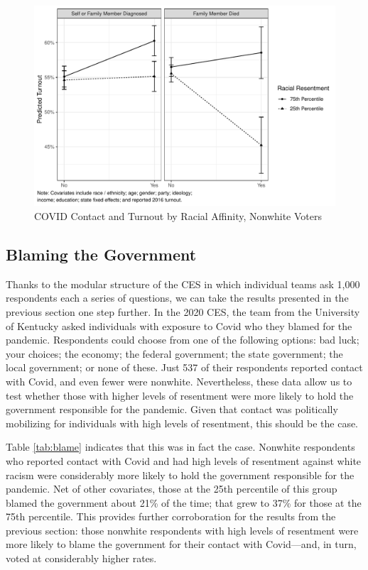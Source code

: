 \documentclass[
  12pt,
]{article}
\begin{document}
\begin{figure}[H]

{\centering \includegraphics{wa_covid_files/figure-latex/mef2-1} 

}

\caption{\label{fig:mef-ces-2}COVID Contact and Turnout by Racial Affinity, Nonwhite Voters}\label{fig:mef2}
\end{figure}

\hypertarget{blaming-the-government}{%
\subsection*{Blaming the Government}\label{blaming-the-government}}

Thanks to the modular structure of the CES in which individual teams ask 1,000 respondents each a series of questions, we can take the results presented in the previous section one step further. In the 2020 CES, the team from the University of Kentucky asked individuals with exposure to Covid who they blamed for the pandemic. Respondents could choose from one of the following options: bad luck; your choices; the economy; the federal government; the state government; the local government; or none of these. Just 537 of their respondents reported contact with Covid, and even fewer were nonwhite. Nevertheless, these data allow us to test whether those with higher levels of resentment were more likely to hold the government responsible for the pandemic. Given that contact was politically mobilizing for individuals with high levels of resentment, this should be the case.

Table \ref{tab:blame} indicates that this was in fact the case. Nonwhite respondents who reported contact with Covid and had high levels of resentment against white racism were considerably more likely to hold the government responsible for the pandemic. Net of other covariates, those at the 25th percentile of this group blamed the government about 21\% of the time; that grew to 37\% for those at the 75th percentile. This provides further corroboration for the results from the previous section: those nonwhite respondents with high levels of resentment were more likely to blame the government for their contact with Covid---and, in turn, voted at considerably higher rates.
\end{document}
